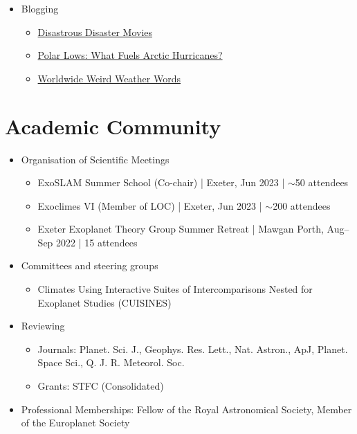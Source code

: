 \documentclass[a4paper, 11pt]{article}
\begin{document}
\begin{itemize}[nosep, leftmargin=10pt]
    \item Blogging
    \begin{itemize}
        \item \href{http://www.scisnack.com/2015/12/17/disastrous-disaster-movies}{Disastrous Disaster Movies}
        \item \href{http://www.scisnack.com/2015/03/04/polar-lows-what-fuels-arctic-hurricanes}{Polar Lows: What Fuels Arctic Hurricanes?}
        \item \href{http://www.scisnack.com/2014/12/17/worldwide-weird-weather-words}{Worldwide Weird Weather Words}
    \end{itemize}
\end{itemize}

\section{Academic Community}
\begin{itemize}[nosep, leftmargin=10pt]
    \item Organisation of Scientific Meetings
    \begin{itemize}
        \item ExoSLAM Summer School (Co-chair) | Exeter, Jun 2023 | $\sim$50 attendees
        \item Exoclimes VI (Member of LOC) | Exeter, Jun 2023 | $\sim$200 attendees
        \item Exeter Exoplanet Theory Group Summer Retreat | Mawgan Porth, Aug--Sep 2022 | 15 attendees
    \end{itemize}
    \item Committees and steering groups
    \begin{itemize}
        \item Climates Using Interactive Suites of Intercomparisons Nested for Exoplanet Studies (CUISINES)
    \end{itemize}
    \item Reviewing
    \begin{itemize}
        \item Journals: Planet. Sci. J., Geophys. Res. Lett., Nat. Astron., ApJ, Planet. Space Sci., Q. J. R. Meteorol. Soc.
        \item Grants: STFC (Consolidated)
    \end{itemize}
    \item Professional Memberships: Fellow of the Royal Astronomical Society, Member of the Europlanet Society
\end{itemize}
\end{document}
